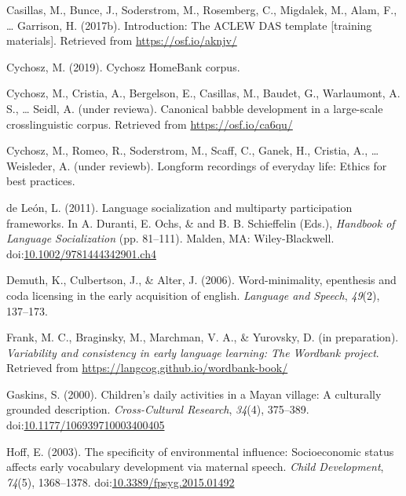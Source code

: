 \documentclass[,man,floatsintext]{apa6}
\begin{document}
\hypertarget{ref-casillas2017ACLEWDAS}{}
Casillas, M., Bunce, J., Soderstrom, M., Rosemberg, C., Migdalek, M.,
Alam, F., \ldots{} Garrison, H. (2017b). Introduction: The ACLEW DAS
template {[}training materials{]}. Retrieved from
\url{https://osf.io/aknjv/}

\hypertarget{ref-Cychosz-HB}{}
Cychosz, M. (2019). Cychosz HomeBank corpus.

\hypertarget{ref-cychoszURcanonical}{}
Cychosz, M., Cristia, A., Bergelson, E., Casillas, M., Baudet, G.,
Warlaumont, A. S., \ldots{} Seidl, A. (under reviewa). Canonical babble
development in a large-scale crosslinguistic corpus. Retrieved from
\url{https://osf.io/ca6qu/}

\hypertarget{ref-cychoszURlongform}{}
Cychosz, M., Romeo, R., Soderstrom, M., Scaff, C., Ganek, H., Cristia,
A., \ldots{} Weisleder, A. (under reviewb). Longform recordings of
everyday life: Ethics for best practices.

\hypertarget{ref-deleon2011language}{}
de León, L. (2011). Language socialization and multiparty participation
frameworks. In A. Duranti, E. Ochs, \& and B. B. Schieffelin (Eds.),
\emph{Handbook of Language Socialization} (pp. 81--111). Malden, MA:
Wiley-Blackwell.
doi:\href{https://doi.org/10.1002/9781444342901.ch4}{10.1002/9781444342901.ch4}

\hypertarget{ref-demuth2006word}{}
Demuth, K., Culbertson, J., \& Alter, J. (2006). Word-minimality,
epenthesis and coda licensing in the early acquisition of english.
\emph{Language and Speech}, \emph{49}(2), 137--173.

\hypertarget{ref-frankIPvariability}{}
Frank, M. C., Braginsky, M., Marchman, V. A., \& Yurovsky, D. (in
preparation). \emph{Variability and consistency in early language
learning: The Wordbank project}. Retrieved from
\url{https://langcog.github.io/wordbank-book/}

\hypertarget{ref-gaskins2000childrens}{}
Gaskins, S. (2000). Children's daily activities in a Mayan village: A
culturally grounded description. \emph{Cross-Cultural Research},
\emph{34}(4), 375--389.
doi:\href{https://doi.org/10.1177/106939710003400405}{10.1177/106939710003400405}

\hypertarget{ref-hoff2003specificity}{}
Hoff, E. (2003). The specificity of environmental influence:
Socioeconomic status affects early vocabulary development via maternal
speech. \emph{Child Development}, \emph{74}(5), 1368--1378.
doi:\href{https://doi.org/10.3389/fpsyg.2015.01492}{10.3389/fpsyg.2015.01492}
\end{document}
